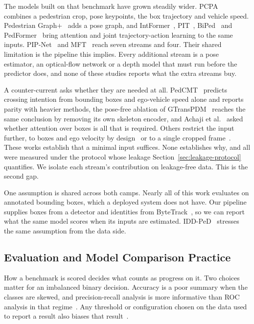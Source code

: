 \documentclass[mti,article,submit,moreauthors]{Definitions/mdpi}
\begin{document}
The models built on that benchmark have grown steadily wider. PCPA~\citep{kotseruba2021benchmark} combines a pedestrian crop, pose keypoints, the box trajectory and vehicle speed. Pedestrian Graph$+$~\citep{cadena2022pedgraph} adds a pose graph, and IntFormer~\citep{lorenzo2021intformer}, PIT~\citep{zhou2023pit}, BiPed~\citep{rasouli2021biped} and PedFormer~\citep{rasouli2023pedformer} bring attention and joint trajectory-action learning to the same inputs. PIP-Net~\citep{azarmi2025pipnet} and MFT~\citep{li2025mft} reach seven streams and four. Their shared limitation is the pipeline this implies. Every additional stream is a pose estimator, an optical-flow network or a depth model that must run before the predictor does, and none of these studies reports what the extra streams buy.

A counter-current asks whether they are needed at all. PedCMT~\citep{chen2024pedcmt} predicts crossing intention from bounding boxes and ego-vehicle speed alone and reports parity with heavier methods, the pose-free ablation of GTransPDM~\citep{xie2025gtranspdm} reaches the same conclusion by removing its own skeleton encoder, and Achaji et al.~\citep{achaji2022attention} asked whether attention over boxes is all that is required. Others restrict the input further, to boxes and ego velocity by design~\citep{liu2025occlusion} or to a single cropped frame~\citep{qu2025efficientpie}. These works establish that a minimal input suffices. None establishes why, and all were measured under the protocol whose leakage Section~\ref{sec:leakage-protocol} quantifies. We isolate each stream's contribution on leakage-free data. This is the second gap.

One assumption is shared across both camps. Nearly all of this work evaluates on annotated bounding boxes, which a deployed system does not have. Our pipeline supplies boxes from a detector and identities from ByteTrack~\citep{zhang2022bytetrack}, so we can report what the same model scores when its inputs are estimated. IDD-PeD~\citep{bokkasam2025iddped} stresses the same assumption from the data side.

\subsection{Evaluation and Model Comparison Practice}
\label{sec:eval-practice}

How a benchmark is scored decides what counts as progress on it. Two choices matter for an imbalanced binary decision. Accuracy is a poor summary when the classes are skewed, and precision-recall analysis is more informative than ROC analysis in that regime~\citep{davis2006precision,saito2015precision}. Any threshold or configuration chosen on the data used to report a result also biases that result~\citep{cawley2010overfitting}.
\end{document}
